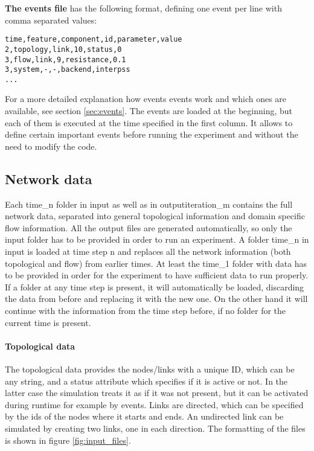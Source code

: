 \documentclass[11pt,fleqn]{book} %
\begin{document}
\textbf{The events file} has the following format, defining one event per line with comma separated values:

\begin{lstlisting}[frame=single] 
time,feature,component,id,parameter,value
2,topology,link,10,status,0
3,flow,link,9,resistance,0.1
3,system,-,-,backend,interpss
...
\end{lstlisting}

For a more detailed explanation how events events work and which ones are available, see  section \ref{sec:events}. The events are loaded at the beginning, but each of them is executed at the time specified in the first column. It allows to define certain important events before running the experiment and without the need to modify the code. 

\subsection{Network data}
Each time\_n folder in input as well as in output\/iteration\_m contains the full network data, separated into general topological information and domain specific flow information. All the output files are generated automatically, so only the input folder has to be provided in order to run an experiment. A folder time\_n in input is loaded at time step n and replaces all the network information (both topological and flow) from earlier times. At least the time\_1 folder with data has to be provided in order for the experiment to have sufficient data to run properly. If a folder at any time step is present, it will automatically be loaded, discarding the data from before and replacing it with the new one. On the other hand it will continue with the information from the time step before, if no folder for the current time is present.

\paragraph{Topological data} The topological data provides the nodes/links with a unique ID, which can be any string, and a status attribute which specifies if it is active or not. In the latter case the simulation treats it as if it was not present, but it can be activated during runtime for example by events. Links are directed, which can be specified by the ids of the nodes where it starts and ends. An undirected link can be simulated by creating two links, one in each direction. The formatting of the files is shown in figure \ref{fig:input_files}.
\end{document}
